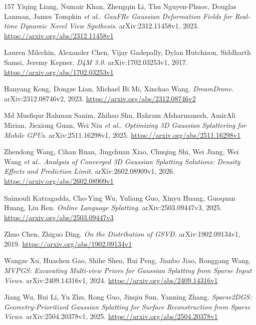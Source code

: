 \documentclass[11pt,a4paper]{article}
\begin{document}
\begin{thebibliography}{157}
Yiqing Liang, Numair Khan, Zhengqin Li, Thu Nguyen-Phuoc, Douglas Lanman, James Tompkin \emph{et al.}.
\newblock \emph{GauFRe Gaussian Deformation Fields for Real-time Dynamic Novel View Synthesis}.
\newblock arXiv:2312.11458v1, 2023.
\newblock \url{https://arxiv.org/abs/2312.11458v1}

Lauren Milechin, Alexander Chen, Vijay Gadepally, Dylan Hutchison, Siddharth Samsi, Jeremy Kepner.
\newblock \emph{D4M 3.0}.
\newblock arXiv:1702.03253v1, 2017.
\newblock \url{https://arxiv.org/abs/1702.03253v1}

Hanyang Kong, Dongze Lian, Michael Bi Mi, Xinchao Wang.
\newblock \emph{DreamDrone}.
\newblock arXiv:2312.08746v2, 2023.
\newblock \url{https://arxiv.org/abs/2312.08746v2}

Md Musfiqur Rahman Sanim, Zhihao Shu, Bahram Afsharmanesh, AmirAli Mirian, Jiexiong Guan, Wei Niu \emph{et al.}.
\newblock \emph{Optimizing 3D Gaussian Splattering for Mobile GPUs}.
\newblock arXiv:2511.16298v1, 2025.
\newblock \url{https://arxiv.org/abs/2511.16298v1}

Zhendong Wang, Cihan Ruan, Jingchuan Xiao, Chuqing Shi, Wei Jiang, Wei Wang \emph{et al.}.
\newblock \emph{Analysis of Converged 3D Gaussian Splatting Solutions: Density Effects and Prediction Limit}.
\newblock arXiv:2602.08909v1, 2026.
\newblock \url{https://arxiv.org/abs/2602.08909v1}

Saimouli Katragadda, Cho-Ying Wu, Yuliang Guo, Xinyu Huang, Guoquan Huang, Liu Ren.
\newblock \emph{Online Language Splatting}.
\newblock arXiv:2503.09447v3, 2025.
\newblock \url{https://arxiv.org/abs/2503.09447v3}

Zhuo Chen, Zhiguo Ding.
\newblock \emph{On the Distribution of GSVD}.
\newblock arXiv:1902.09134v1, 2019.
\newblock \url{https://arxiv.org/abs/1902.09134v1}

Wangze Xu, Huachen Gao, Shihe Shen, Rui Peng, Jianbo Jiao, Ronggang Wang.
\newblock \emph{MVPGS: Excavating Multi-view Priors for Gaussian Splatting from Sparse Input Views}.
\newblock arXiv:2409.14316v1, 2024.
\newblock \url{https://arxiv.org/abs/2409.14316v1}

Jiang Wu, Rui Li, Yu Zhu, Rong Guo, Jinqiu Sun, Yanning Zhang.
\newblock \emph{Sparse2DGS: Geometry-Prioritized Gaussian Splatting for Surface Reconstruction from Sparse Views}.
\newblock arXiv:2504.20378v1, 2025.
\newblock \url{https://arxiv.org/abs/2504.20378v1}


\end{thebibliography}
\end{document}
